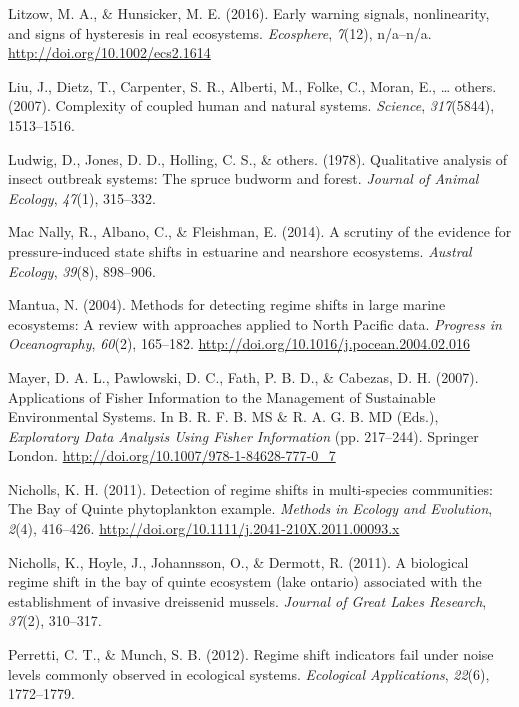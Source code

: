 \documentclass[12pt,twoside,openany]{reedthesis}
\begin{document}
\hypertarget{ref-litzow_early_2016}{}
Litzow, M. A., \& Hunsicker, M. E. (2016). Early warning signals,
nonlinearity, and signs of hysteresis in real ecosystems.
\emph{Ecosphere}, \emph{7}(12), n/a--n/a.
\url{http://doi.org/10.1002/ecs2.1614}

\hypertarget{ref-liu_complexity_2007}{}
Liu, J., Dietz, T., Carpenter, S. R., Alberti, M., Folke, C., Moran, E.,
\ldots{} others. (2007). Complexity of coupled human and natural
systems. \emph{Science}, \emph{317}(5844), 1513--1516.

\hypertarget{ref-ludwig1978qualitative}{}
Ludwig, D., Jones, D. D., Holling, C. S., \& others. (1978). Qualitative
analysis of insect outbreak systems: The spruce budworm and forest.
\emph{Journal of Animal Ecology}, \emph{47}(1), 315--332.

\hypertarget{ref-mac2014scrutiny}{}
Mac Nally, R., Albano, C., \& Fleishman, E. (2014). A scrutiny of the
evidence for pressure-induced state shifts in estuarine and nearshore
ecosystems. \emph{Austral Ecology}, \emph{39}(8), 898--906.

\hypertarget{ref-mantua_methods_2004}{}
Mantua, N. (2004). Methods for detecting regime shifts in large marine
ecosystems: A review with approaches applied to North Pacific data.
\emph{Progress in Oceanography}, \emph{60}(2), 165--182.
\url{http://doi.org/10.1016/j.pocean.2004.02.016}

\hypertarget{ref-mayer_applications_2007}{}
Mayer, D. A. L., Pawlowski, D. C., Fath, P. B. D., \& Cabezas, D. H.
(2007). Applications of Fisher Information to the Management of
Sustainable Environmental Systems. In B. R. F. B. MS \& R. A. G. B. MD
(Eds.), \emph{Exploratory Data Analysis Using Fisher Information} (pp.
217--244). Springer London.
\url{http://doi.org/10.1007/978-1-84628-777-0_7}

\hypertarget{ref-nicholls_detection_2011}{}
Nicholls, K. H. (2011). Detection of regime shifts in multi-species
communities: The Bay of Quinte phytoplankton example. \emph{Methods in
Ecology and Evolution}, \emph{2}(4), 416--426.
\url{http://doi.org/10.1111/j.2041-210X.2011.00093.x}

\hypertarget{ref-nicholls2011biological}{}
Nicholls, K., Hoyle, J., Johannsson, O., \& Dermott, R. (2011). A
biological regime shift in the bay of quinte ecosystem (lake ontario)
associated with the establishment of invasive dreissenid mussels.
\emph{Journal of Great Lakes Research}, \emph{37}(2), 310--317.

\hypertarget{ref-perretti2012regime}{}
Perretti, C. T., \& Munch, S. B. (2012). Regime shift indicators fail
under noise levels commonly observed in ecological systems.
\emph{Ecological Applications}, \emph{22}(6), 1772--1779.
\end{document}
